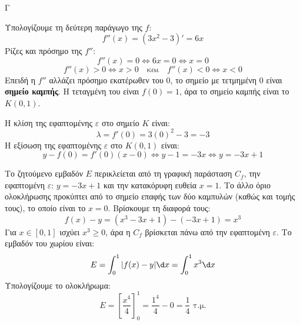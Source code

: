 \begin{thema}{Γ}
\begin{erwthma}
  \item 
  Υπολογίζουμε τη δεύτερη παράγωγο της $f$:
  \[ f''(x) = (3x^2 - 3)' = 6x \]
  Ρίζες και πρόσημο της $f''$:
  \[ f''(x) = 0 \Leftrightarrow 6x = 0 \Leftrightarrow x = 0 \]
  \[ f''(x) > 0 \Leftrightarrow x > 0 \quad \text{και} \quad f''(x) < 0 \Leftrightarrow x < 0 \]
  Επειδή η $f''$ αλλάζει πρόσημο εκατέρωθεν του $0$, το σημείο με τετμημένη $0$ είναι \textbf{σημείο καμπής}. Η τεταγμένη του είναι $f(0) = 1$, άρα το σημείο καμπής είναι το $K(0, 1)$.
  
  Η κλίση της εφαπτομένης $\varepsilon$ στο σημείο $K$ είναι:
  \[ \lambda = f'(0) = 3(0)^2 - 3 = -3 \]
  Η εξίσωση της εφαπτομένης $\varepsilon$ στο $K(0,1)$ είναι:
  \[ y - f(0) = f'(0)(x - 0) \Leftrightarrow y - 1 = -3x \Leftrightarrow y = -3x + 1 \]

  \item 
  Το ζητούμενο εμβαδόν $E$ περικλείεται από τη γραφική παράσταση $C_f$, την εφαπτομένη $\varepsilon$: $y = -3x+1$ και την κατακόρυφη ευθεία $x = 1$. 
  Το άλλο όριο ολοκλήρωσης προκύπτει από το σημείο επαφής των δύο καμπυλών (καθώς και τομής τους), το οποίο είναι το $x=0$.
  Βρίσκουμε τη διαφορά τους:
  \[ f(x) - y = (x^3 - 3x + 1) - (-3x + 1) = x^3 \]
  Για $x \in [0, 1]$ ισχύει $x^3 \ge 0$, άρα η $C_f$ βρίσκεται πάνω από την εφαπτομένη $\varepsilon$. 
  Το εμβαδόν του χωρίου είναι:
  \[ E = \int_0^1 |f(x) - y| \d x = \int_0^1 x^3 \d x \]
  Υπολογίζουμε το ολοκλήρωμα:
  \[ E = \left[ \frac{x^4}{4} \right]_0^1 = \frac{1^4}{4} - 0 = \frac{1}{4} \text{ τ.μ.} \]
\end{erwthma}
\end{thema}


